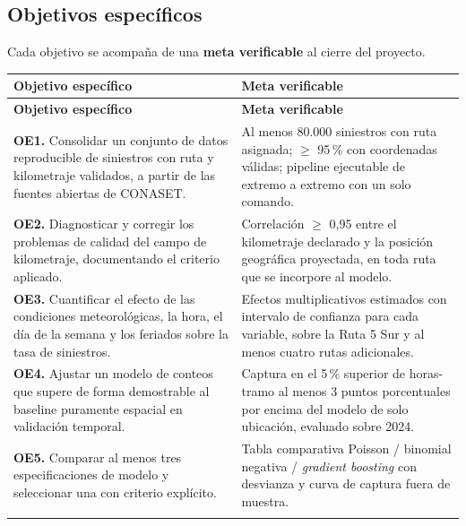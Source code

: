 \documentclass[11pt,a4paper]{article}
\begin{document}
\subsection{Objetivos específicos}

Cada objetivo se acompaña de una \textbf{meta verificable} al cierre del
proyecto.

\begin{longtable}[c]{p{}p{}}
\toprule
\textbf{Objetivo específico} & \textbf{Meta verificable}\\
\midrule
\endfirsthead
\toprule
\textbf{Objetivo específico} & \textbf{Meta verificable}\\
\midrule
\endhead
\bottomrule
\endlastfoot

\textbf{OE1.} Consolidar un conjunto de datos reproducible de siniestros con
ruta y kilometraje validados, a partir de las fuentes abiertas de CONASET.
& Al menos 80.000 siniestros con ruta asignada; $\geq$ 95\,\% con coordenadas
válidas; pipeline ejecutable de extremo a extremo con un solo comando.\\
\addlinespace

\textbf{OE2.} Diagnosticar y corregir los problemas de calidad del campo de
kilometraje, documentando el criterio aplicado.
& Correlación $\geq$ 0,95 entre el kilometraje declarado y la posición
geográfica proyectada, en toda ruta que se incorpore al modelo.\\
\addlinespace

\textbf{OE3.} Cuantificar el efecto de las condiciones meteorológicas, la hora,
el día de la semana y los feriados sobre la tasa de siniestros.
& Efectos multiplicativos estimados con intervalo de confianza para cada
variable, sobre la Ruta 5 Sur y al menos cuatro rutas adicionales.\\
\addlinespace

\textbf{OE4.} Ajustar un modelo de conteos que supere de forma demostrable al
baseline puramente espacial en validación temporal.
& Captura en el 5\,\% superior de horas-tramo al menos 3 puntos porcentuales por
encima del modelo de solo ubicación, evaluado sobre 2024.\\
\addlinespace

\textbf{OE5.} Comparar al menos tres especificaciones de modelo y seleccionar
una con criterio explícito.
& Tabla comparativa Poisson / binomial negativa / \emph{gradient boosting} con
desvianza y curva de captura fuera de muestra.\\
\addlinespace


\end{longtable}
\end{document}
